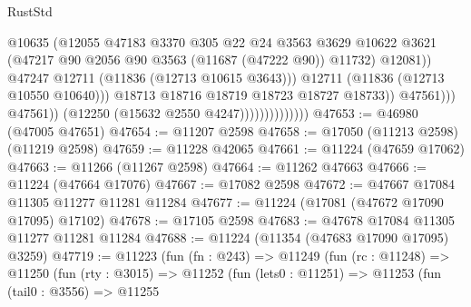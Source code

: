 \begin{lexlean}{RustStd}
\begin{coremodule}
                                                @10635
                                                (@12055
                                                  @47183
                                                  @3370
                                                  @305
                                                  @22
                                                  @24
                                                  @3563
                                                  @3629
                                                  @10622
                                                  @3621
                                                  (@47217
                                                    @90
                                                    @2056
                                                    @90
                                                    @3563
                                                    (@11687 (@47222 @90))
                                                    @11732)
                                                  @12081))
                                              @47247
                                              @12711
                                              (@11836 (@12713 @10615 @3643)))
                                            @12711
                                            (@11836 (@12713 @10550 @10640)))
                                          @18713
                                          @18716
                                          @18719
                                          @18723
                                          @18727
                                          @18733))
                                      @47561)))
                                @47561))
                            (@12250 (@15632 @2550 @4247))))))))))))))
@47653 := @46980 (@47005 @47651)
@47654 := @11207 @2598
@47658 := @17050 (@11213 @2598) (@11219 @2598)
@47659 := @11228 @42065
@47661 := @11224 (@47659 @17062)
@47663 := @11266 (@11267 @2598)
@47664 := @11262 @47663
@47666 := @11224 (@47664 @17076)
@47667 := @17082 @2598
@47672 := @47667 @17084 @11305 @11277 @11281 @11284
@47677 := @11224 (@17081 (@47672 @17090 @17095) @17102)
@47678 := @17105 @2598
@47683 := @47678 @17084 @11305 @11277 @11281 @11284
@47688 := @11224 (@11354 (@47683 @17090 @17095) @3259)
@47719 := @11223
    (fun (fn : @243) =>
    @11249
      (fun (rc : @11248) =>
      @11250
        (fun (rty : @3015) =>
        @11252
          (fun (lets0 : @11251) =>
          @11253
            (fun (tail0 : @3556) =>
            @11255

\end{coremodule}
\end{lexlean}
